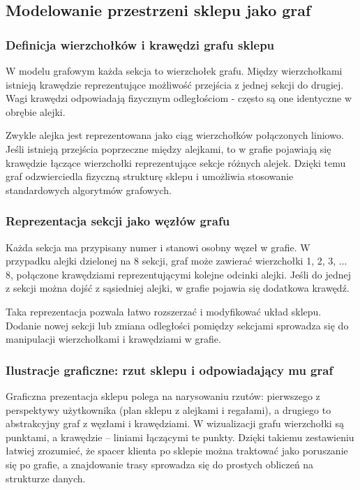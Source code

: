 \subsection{Modelowanie przestrzeni sklepu jako graf}

\subsubsection{Definicja wierzchołków i krawędzi grafu sklepu}
W modelu grafowym każda sekcja to wierzchołek grafu. Między wierzchołkami istnieją krawędzie reprezentujące możliwość przejścia z jednej sekcji do drugiej. Wagi krawędzi odpowiadają fizycznym odległościom - często są one identyczne w obrębie alejki.

Zwykle alejka jest reprezentowana jako ciąg wierzchołków połączonych liniowo. Jeśli istnieją przejścia poprzeczne między alejkami, to w grafie pojawiają się krawędzie łączące wierzchołki reprezentujące sekcje różnych alejek. Dzięki temu graf odzwierciedla fizyczną strukturę sklepu i umożliwia stosowanie standardowych algorytmów grafowych.

\subsubsection{Reprezentacja sekcji jako węzłów grafu}
Każda sekcja ma przypisany numer i stanowi osobny węzeł w grafie. W przypadku alejki dzielonej na 8 sekcji, graf może zawierać wierzchołki 1, 2, 3, ... 8, połączone krawędziami reprezentującymi kolejne odcinki alejki. Jeśli do jednej z sekcji można dojść z sąsiedniej alejki, w grafie pojawia się dodatkowa krawędź.

Taka reprezentacja pozwala łatwo rozszerzać i modyfikować układ sklepu. Dodanie nowej sekcji lub zmiana odległości pomiędzy sekcjami sprowadza się do manipulacji wierzchołkami i krawędziami w grafie.

\subsubsection{Ilustracje graficzne: rzut sklepu i odpowiadający mu graf}
Graficzna prezentacja sklepu polega na narysowaniu rzutów: pierwszego z perspektywy użytkownika (plan sklepu z alejkami i regałami), a drugiego to abstrakcyjny graf z węzłami i krawędziami.  
W wizualizacji grafu wierzchołki są punktami, a krawędzie – liniami łączącymi te punkty. Dzięki takiemu zestawieniu łatwiej zrozumieć, że spacer klienta po sklepie można traktować jako poruszanie się po grafie, a znajdowanie trasy sprowadza się do prostych obliczeń na strukturze danych.


